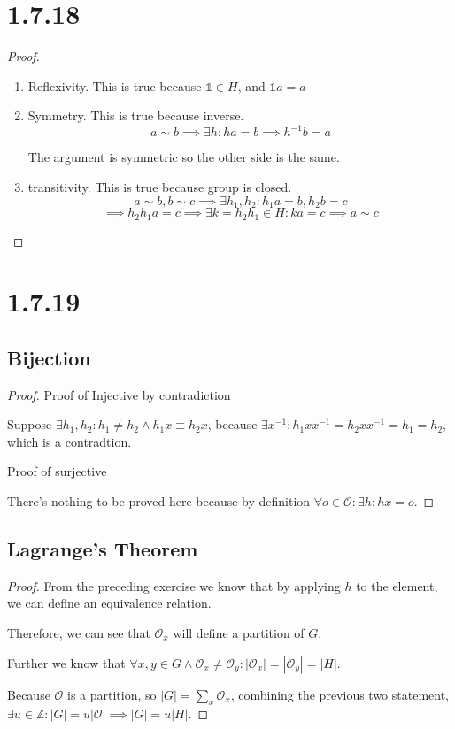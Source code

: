 \documentclass[11pt]{article}
\newcommand{\one}{\mathds{1}}
\newcommand{\Z}{\mathbb{Z}}
\begin{document}
\section*{1.7.18}

\begin{proof}
	\begin{enumerate}
		\item Reflexivity. This is true because $\one \in H$, and $\one a = a$
		\item Symmetry. This is true because inverse.
		      $$
			      a \sim b \implies \exists h : ha=b \implies h^{-1} b = a
		      $$

		      The argument is symmetric so the other side is the same.

		\item transitivity. This is true because group is closed.
		      $$
			      a \sim b, b \sim c \implies \exists h_1,h_2 : h_1a=b, h_2b=c
		      $$
		      $$
			      \implies h_2 h_1 a = c \implies \exists k = h_2 h_1 \in H : ka=c \implies a \sim c
		      $$
	\end{enumerate}
\end{proof}

\section*{1.7.19}

\subsection*{Bijection}

\begin{proof}
	Proof of Injective by contradiction

	Suppose $\exists h_1,h_2 : h_1 \neq h_2 \land h_1x\equiv h_2x$,
	because $\exists x^{-1} : h_1x x^{-1} = h_2x x^{-1} = h_1 = h_2$, which is a contradtion.

	Proof of surjective

	There's nothing to be proved here because by definition $\forall o \in \mathcal{O} : \exists h : hx = o$.

\end{proof}

\subsection*{Lagrange's Theorem}

\begin{proof}
	From the preceding exercise we know that by applying $h$ to the element, we can define an equivalence relation.

	Therefore, we can see that $\mathcal{O}_x$ will define a partition of $G$.

	Further we know that $\forall x,y \in G \land \mathcal{O}_x \neq \mathcal{O}_y: |\mathcal{O}_x|=|\mathcal{O}_y|=|H|$.

	Because $\mathcal{O}$ is a partition, so $|G|=\sum\limits_{x}^{} \mathcal{O}_x$,
	combining the previous two statement, $\exists u \in \Z : |G| = u|\mathcal{O}| \implies |G|=u|H|$.
\end{proof}
\end{document}
